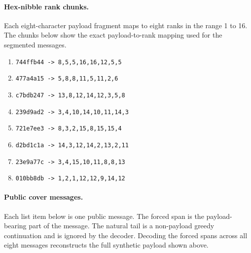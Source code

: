 \documentclass[fleqn,10pt]{wlscirep}
\begin{document}
\paragraph{Hex-nibble rank chunks.}
Each eight-character payload fragment maps to eight ranks in the range 1 to 16. The chunks below show the exact payload-to-rank mapping used for the segmented messages.

\begin{enumerate}
\item \texttt{744ffb44 -> 8,5,5,16,16,12,5,5}
\item \texttt{477a4a15 -> 5,8,8,11,5,11,2,6}
\item \texttt{c7bdb247 -> 13,8,12,14,12,3,5,8}
\item \texttt{239d9ad2 -> 3,4,10,14,10,11,14,3}
\item \texttt{721e7ee3 -> 8,3,2,15,8,15,15,4}
\item \texttt{d2bd1c1a -> 14,3,12,14,2,13,2,11}
\item \texttt{23e9a77c -> 3,4,15,10,11,8,8,13}
\item \texttt{010bb8db -> 1,2,1,12,12,9,14,12}
\end{enumerate}

\paragraph{Public cover messages.}
Each list item below is one public message. The forced span is the payload-bearing part of the message. The natural tail is a non-payload greedy continuation and is ignored by the decoder. Decoding the forced spans across all eight messages reconstructs the full synthetic payload shown above.
\end{document}
